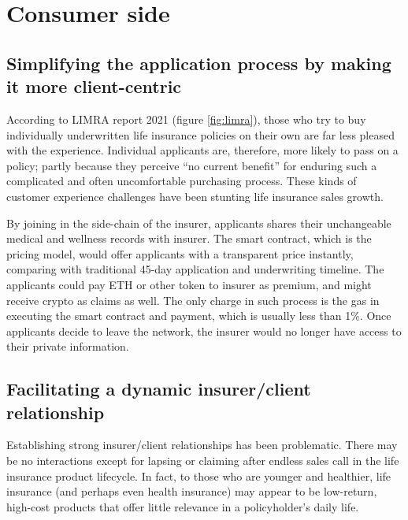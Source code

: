 \section{Consumer side}

\subsection{Simplifying the application process by making it more client-centric}

According to LIMRA report 2021 (figure \ref{fig:limra}),
those who try to buy individually underwritten life insurance policies on their own are far less pleased with the experience.
Individual applicants are, therefore, more likely to pass on a policy;
partly because they perceive “no current benefit” for enduring such a complicated and often uncomfortable purchasing process.
These kinds of customer experience challenges have been stunting life insurance sales growth.

By joining in the side-chain of the insurer, applicants shares their unchangeable
medical and wellness records with insurer. The smart contract, which is the
pricing model, would offer applicants with a transparent price instantly,
comparing with traditional 45-day application and underwriting timeline.
The applicants could pay ETH or other token to insurer as premium, and might receive
crypto as claims as well. The only charge in such process is the gas in executing
the smart contract and payment, which is usually less than 1\%.
Once applicants decide to leave the network,
the insurer would no longer have access to their private information.

\subsection{Facilitating a dynamic insurer/client relationship}

Establishing strong insurer/client relationships has been problematic.
There may be no interactions except for lapsing or claiming after endless sales call in the life insurance product lifecycle.
In fact, to those who are younger and healthier,
life insurance (and perhaps even health insurance) may appear to be low-return,
high-cost products that offer little relevance in a policyholder’s daily life.

